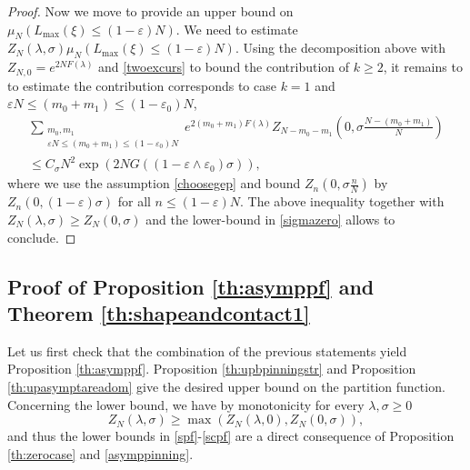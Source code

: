 \documentclass[reqno,11pt]{amsart}
\numberwithin{equation}{section}
\newcommand{\gep}{\varepsilon}       %
\newcommand{\gl}{\lambda}
\newcommand{\gs}{\sigma}
\newcommand{\sumtwo}[2]{\sum_{\substack{#1 \\ #2}}} %
\begin{document}
\begin{proof}
Now we move to provide an upper bound on $\mu_N(L_{\max}(\xi) \le (1-\gep)N)$. We need to estimate 
 $Z_N(\gl,\sigma)\mu_N(L_{\max}(\xi) \le (1-\gep)N)$.
Using the decomposition above with $Z_{N,0}=e^{2N  F(\gl)}$ and \eqref{twoexcurs} to bound the contribution of $k \ge  2$, it remains to  to estimate the contribution corresponds to case  $k=1$ and $\gep N \le (m_0+m_1) \le (1-\gep_0)N$, 
\begin{multline}
  \sumtwo{m_0,m_1}{\gep N \le (m_0+m_1) \le (1-\gep_0)N} e^{2(m_0+m_1)   F(\gl)}
 Z_{N-m_0-m_1}\left(0, \sigma \frac{N-(m_0+m_1)}{N}\right)
\\ \le C_{\gs} N^2 \exp \left(2N   G((1- \gep \wedge  \gep_0)\gs) \right),
\end{multline}
where we use the assumption \eqref{choosegep} and bound $Z_n(0, \gs \frac{n}{N})$ by $Z_n(0, (1-\gep)\gs)$ for all $n \le (1-\gep)N$.
The above inequality together with  $Z_N(\gl, \gs) \ge Z_N(0, \gs)$ and the lower-bound in \eqref{sigmazero}  allows to conclude.

\end{proof}




\subsection{Proof of Proposition \ref{th:asymppf} and Theorem \ref{th:shapeandcontact1}}
Let us first check that the combination of the previous statements yield Proposition \ref{th:asymppf}.
Proposition \ref{th:upbpinningstr} and Proposition \ref{th:upasymptareadom} give the desired upper bound on the partition function. Concerning the lower bound, we have by monotonicity for every $\gl,\sigma\ge 0$
 \begin{equation}\label{lowerbound}
Z_N(\lambda, \sigma)\geq \max \left( Z_N(\lambda, 0), Z_N(0, \sigma) \right),
\end{equation}
and thus the lower bounds in \eqref{spf}-\eqref{scpf} are a direct consequence of Proposition \ref{th:zerocase} and \eqref{asymppinning}.
\end{document}
